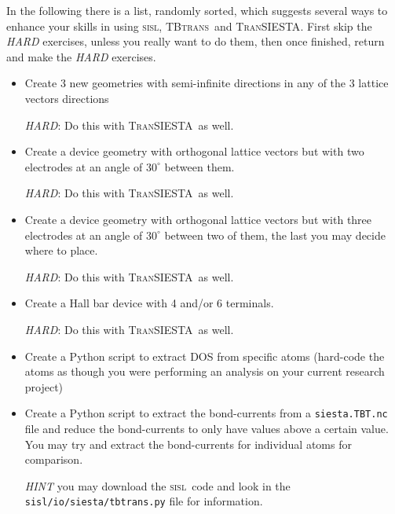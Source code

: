 \documentclass[10pt]{article}
\newcommand\sisl{\textsc{sisl}}
\newcommand\tbt{\textsc{TBtrans}}
\newcommand\ts{\textsc{TranSIESTA}}
\newcommand\script[1]{\texttt{#1}}
\begin{document}
In the following there is a list, randomly sorted, which suggests several ways to enhance
your skills in using \sisl, \tbt\ and \ts.
%
First skip the \emph{HARD} exercises, unless you really want to do them, then once
finished, return and make the \emph{HARD} exercises.
\begin{itemize}
  \item Create 3 new geometries with semi-infinite directions in any of the 3
  lattice vectors directions

  \emph{HARD}: Do this with \ts\ as well.

  \item Create a device geometry with orthogonal lattice vectors but with two electrodes
  at an angle of $30^\circ$ between them.

  \emph{HARD}: Do this with \ts\ as well.

  \item Create a device geometry with orthogonal lattice vectors but with three electrodes
  at an angle of $30^\circ$ between two of them, the last you may decide where to place.

  \emph{HARD}: Do this with \ts\ as well.

  \item Create a Hall bar device with 4 and/or 6 terminals.

  \emph{HARD}: Do this with \ts\ as well.

  \item Create a Python script to extract DOS from specific atoms (hard-code the atoms as
  though you were performing an analysis on your current research project)

  \item Create a Python script to extract the bond-currents from a \script{siesta.TBT.nc}
  file and reduce the bond-currents to only have values above a certain value.
  You may try and extract the bond-currents for individual atoms for comparison.

  \emph{HINT} you may download the \sisl\ code and look in the
  \script{sisl/io/siesta/tbtrans.py} file for information.

\end{itemize}
\end{document}
